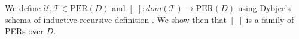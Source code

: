 \documentclass{LMCS}
\theoremstyle{plain}\newtheorem{satz}[thm]{Satz}
\newcommand{\SHORTVERSION}[1]{}
\newcommand{\into}{\rightarrow}
\newcommand{\p}{\mathsf{p}}
\newcommand{\q}{\mathsf{q}}
\newcommand{\calX}{\mathcal{X}}
\newcommand{\calF}{\mathcal{F}}
\newcommand{\singD}[2]{\{\!\!\{#1\}\!\!\}_{#2}}
\newcommand{\sigD}[2]{\coprod\,#1\,#2}
\newcommand{\dom}{\mathit{dom}}
\newcommand{\perD}{\mbox{PER}(D)}
\newcommand{\perU}{\mathcal{U}}
\newcommand{\perT}{\mathcal{T}}
\newcommand{\one}{\mathbf{1}}
\newcommand{\iO}{\top}
\newcommand{\SHORTVERSION}[1]{#1}
\begin{document}
\SHORTVERSION{
  The following definitions are standard
  \cite{aspinall:csl94,coquandPollackTakeyama:fundinf05} (except for
  $\one$); they will be used in the definition of the model.  
\begin{defi} Let $\calX\in\perD$ and $\calF\in \calX\into \perD$.
  \begin{enumerate}[\em(1)]
  \item $\one = \{(\iO,\iO)\}$;
  \item $\sigD{\calX}{\calF} = \{(d,d')\ |\ \p\ d = \p\ d' \in \calX \mbox{ and }
    \q\ d = \q\ d' \in \calF\ (\p\ d)\}$;
  \item $\prod\,\calX\,\calF = \{(f,f')\ |\ f\cdot d = f'\cdot d' \in \calF\ d,
    \mbox{ for all } d = d' \in \calX\}$;
  \item $\singD{d}{\calX} = \{(e,e')\ |\ d = e \in \calX \mbox{ and } d = e'
    \in \calX\}$.
  \end{enumerate}
\end{defi}
}

We define $\perU, \perT\in \perD$ and $[\_] : \dom(\perT) \into
\perD$ using Dybjer's schema of inductive-recursive definition 
\cite{dybjer:jsl00}. We show then that $[\_]$ is a family of PERs
over $D$.
\end{document}
